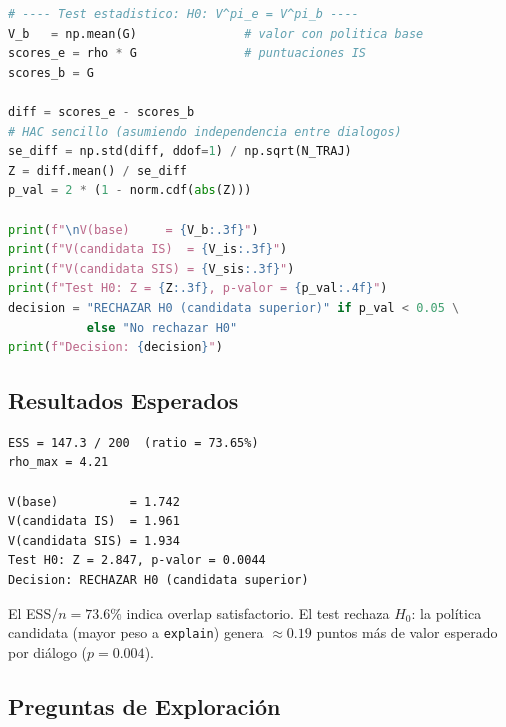 \begin{lstlisting}[language=Python, caption={Lab F.12: Pipeline OPE para agente LLM con test de comparacion.}]
# ---- Test estadistico: H0: V^pi_e = V^pi_b ----
V_b   = np.mean(G)               # valor con politica base
scores_e = rho * G               # puntuaciones IS
scores_b = G

diff = scores_e - scores_b
# HAC sencillo (asumiendo independencia entre dialogos)
se_diff = np.std(diff, ddof=1) / np.sqrt(N_TRAJ)
Z = diff.mean() / se_diff
p_val = 2 * (1 - norm.cdf(abs(Z)))

print(f"\nV(base)     = {V_b:.3f}")
print(f"V(candidata IS)  = {V_is:.3f}")
print(f"V(candidata SIS) = {V_sis:.3f}")
print(f"Test H0: Z = {Z:.3f}, p-valor = {p_val:.4f}")
decision = "RECHAZAR H0 (candidata superior)" if p_val < 0.05 \
           else "No rechazar H0"
print(f"Decision: {decision}")
\end{lstlisting}

\subsection*{Resultados Esperados}

\begin{verbatim}
ESS = 147.3 / 200  (ratio = 73.65%)
rho_max = 4.21

V(base)          = 1.742
V(candidata IS)  = 1.961
V(candidata SIS) = 1.934
Test H0: Z = 2.847, p-valor = 0.0044
Decision: RECHAZAR H0 (candidata superior)
\end{verbatim}

El ESS/$n = 73.6\%$ indica overlap satisfactorio. El test rechaza $H_0$:
la política candidata (mayor peso a \texttt{explain}) genera
$\approx 0.19$ puntos más de valor esperado por diálogo ($p = 0.004$).

\subsection*{Preguntas de Exploración}

